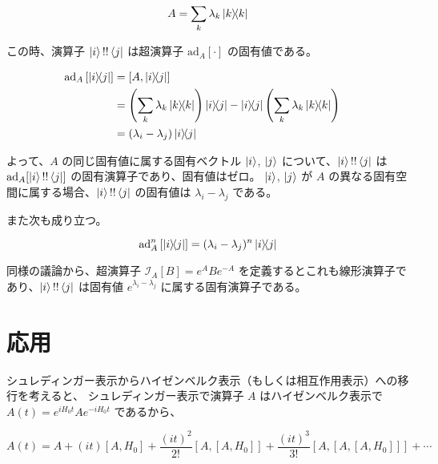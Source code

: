 \documentclass[a4paper, platex]{jsarticle}
\begin{document}
\begin{equation}
A = \sum_k \lambda_k \ket{k}\!\!\bra{k}
\end{equation}

この時、演算子 \(\ket{i}\\!\\!\bra{j}\) は超演算子
\(\mathrm{ad}_A[\cdot]\) の固有値である。

\begin{align}
\mathrm{ad}_A\left[\ket{i}\!\!\bra{j}\right] &= [A, \ket{i}\!\!\bra{j}] \cr
  &= \left(\sum_k \lambda_k \ket{k}\!\!\bra{k}\right) \ket{i}\!\!\bra{j} - \ket{i}\!\!\bra{j} \left( \sum_k \lambda_k \ket{k}\!\!\bra{k} \right) \cr
  &= (\lambda_i - \lambda_j) \ket{i}\!\!\bra{j}
\end{align}

よって、\(A\) の同じ固有値に属する固有ベクトル \(\ket{i}\), \(\ket{j}\)
について、\(\ket{i}\\!\\!\bra{j}\) は
\(\mathrm{ad}_A[\ket{i}\\!\\!\bra{j}]\)
の固有演算子であり、固有値はゼロ。 \(\ket{i}\), \(\ket{j}\) が \(A\)
の異なる固有空間に属する場合、\(\ket{i}\\!\\!\bra{j}\) の固有値は
\(\lambda_i - \lambda_j\) である。

また次も成り立つ。

\begin{equation}
\mathrm{ad}_A^n\left[\ket{i}\!\!\bra{j}\right] = (\lambda_i - \lambda_j)^n \ket{i}\!\!\bra{j}
\end{equation}

同様の議論から、超演算子 \(\mathcal{I}_A[B] = e^A B e^{-A}\)
を定義するとこれも線形演算子であり、\(\ket{i}\\!\\!\bra{j}\) は固有値
\(e^{\lambda_i - \lambda_j}\) に属する固有演算子である。

\hypertarget{ux5fdcux7528}{%
\section{応用}\label{ux5fdcux7528}}

シュレディンガー表示からハイゼンベルク表示（もしくは相互作用表示）への移行を考えると、
シュレディンガー表示で演算子 \(A\) はハイゼンベルク表示で
\(A(t) = e^{iH_0t} A e^{-iH_0t}\) であるから、

\begin{equation}
A(t) = A + (it) [A,H_0] + \frac{(it)^2}{2!} [A, [A, H_0]] + \frac{(it)^3}{3!} [A, [A, [A, H_0]]] + \cdots
\end{equation}
\end{document}
